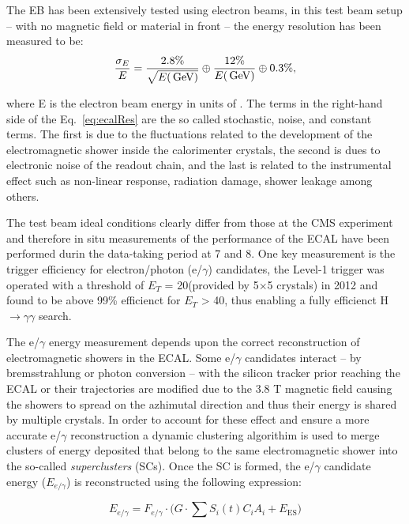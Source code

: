 The EB has been extensively tested using electron beams, in this test
beam setup -- with no magnetic field or material in front -- the
energy resolution has been measured to be:
\begin{equation}\label{eq:ecalRes}
\frac{\sigma_{E}}{E} = \frac{2.8\%}{\sqrt{E(\,\text{Ge\hspace{-.08em}V})}} \oplus
\frac{12\%}{E(\,\text{Ge\hspace{-.08em}V})} \oplus 0.3\%,
\end{equation}

where E is the electron beam energy in units of \GeV. The terms in the
right-hand side of the Eq.~\ref{eq:ecalRes} are the so called
stochastic, noise, and constant terms. The first is due to the
fluctuations related to the development of the electromagnetic shower
inside the calorimenter crystals, the second is dues to electronic
noise of the readout chain, and the last is related to the
instrumental effect such as non-linear response, radiation damage,
shower leakage among others.

The test beam ideal conditions clearly differ from those at the CMS
experiment and therefore in situ measurements of the performance of
the ECAL have been performed durin the data-taking period at 7 and
8\TeV. One key measurement is the trigger efficiency for
electron/photon (e/$\gamma$) candidates, the Level-1 trigger was
operated with a threshold of $E_{T}$ = 20\GeV (provided by 5$\times$5
crystals) in 2012 and found to be above 99\% efficienct for $E_{T}$ >
40\GeV, thus enabling a fully efficienct H$\rightarrow\gamma\gamma$
search.

The e/$\gamma$ energy measurement depends upon the correct
reconstruction of electromagnetic showers in the ECAL. Some e/$\gamma$
candidates interact -- by bremsstrahlung or photon conversion -- with
the silicon tracker  prior reaching the ECAL or their trajectories are
modified due to the 3.8 T magnetic field causing the showers to spread
on the azhimutal direction and thus their energy is shared by multiple
crystals. In order to account for these effect and ensure a more
accurate e/$\gamma$ reconstruction a dynamic clustering algorithim is
used to merge clusters of energy deposited that belong to the same
electromagnetic shower into the so-called \textit{superclusters}
(SCs). Once the SC is formed, the e/$\gamma$ candidate energy
($E_{e/\gamma}$) is reconstructed using the following expression:

\begin{equation}
\label{eq:ecalE}
E_{e/\gamma} = F_{e/\gamma}\cdot \big(G\cdot\sum S_{i}(t)C_{i}A_{i} + E_{\mathrm{ES}}\big)
\end{equation}
 
